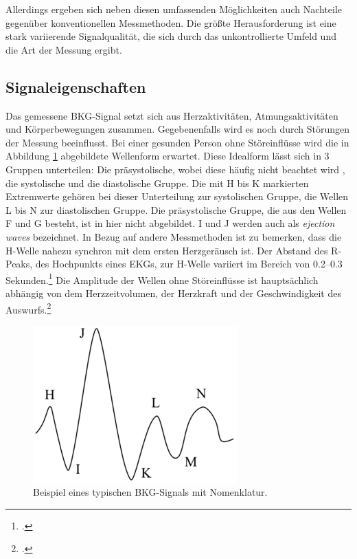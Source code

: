 	Allerdings ergeben sich neben diesen umfassenden Möglichkeiten auch Nachteile gegenüber konventionellen Messmethoden. Die größte Herausforderung ist eine stark variierende Signalqualität, die sich durch das unkontrollierte Umfeld und die Art der Messung ergibt.

	\subsection{Signaleigenschaften}
	
	Das gemessene \ac{BKG}-Signal setzt sich aus Herzaktivitäten, Atmungsaktivitäten und Körperbewegungen zusammen. Gegebenenfalls wird es noch durch Störungen der Messung beeinflusst. Bei einer gesunden Person ohne Störeinflüsse wird die in Abbildung \ref{fig:bcgwaveform} abgebildete Wellenform erwartet. Diese Idealform lässt sich in 3 Gruppen unterteilen: Die präsystolische, wobei diese häufig nicht beachtet wird%
	, die systolische und die diastolische Gruppe. Die mit H bis K markierten Extremwerte gehören bei dieser Unterteilung zur systolischen Gruppe, die Wellen L bis N zur diastolischen Gruppe. Die präsystolische Gruppe, die aus den Wellen F und G besteht, ist in hier nicht abgebildet. I und J werden auch als \textit{ejection waves} bezeichnet. In Bezug auf andere Messmethoden ist zu bemerken, dass die H-Welle nahezu synchron mit dem ersten Herzgeräusch ist. Der Abstand des R-Peaks, des Hochpunkts eines \ac{EKG}s, zur H-Welle variiert im Bereich von \numrange{0,2}{0,3} Sekunden.\footcite{DELALLA1950} Die Amplitude der Wellen ohne Störeinflüsse ist hauptsächlich abhängig von dem Herzzeitvolumen, der Herzkraft und der Geschwindigkeit des Auswurfs.\footcite{Pinheiro2010}
	
	\begin{figure}[H]
		\centering
		\includegraphics[width=0.7\textwidth]{pic/bcgWaveform.png}
		\caption[Beispiel eines typischen \ac{BKG}-Signals mit Nomenklatur]{Beispiel eines typischen \ac{BKG}-Signals mit Nomenklatur.\protect\footnotemark}
		\label{fig:bcgwaveform}
	\end{figure}
	
